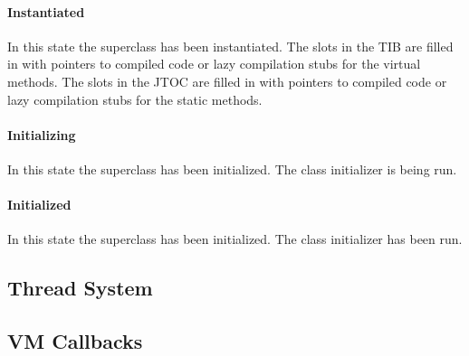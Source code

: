 \paragraph{Instantiated}
In this state the superclass has been instantiated.  The
slots in the TIB are filled in with pointers to compiled code or lazy
compilation stubs for
the virtual methods.  The slots in the JTOC are filled in with
pointers to compiled code or lazy compilation stubs for the static methods.

\paragraph{Initializing} 
In this state the superclass has been initialized. The class
initializer is being run. 

\paragraph{Initialized} 
In this state the superclass has been initialized. The class initializer has 
been run. 

\subsection{Thread System}\label{sec:threads}



\subsection{VM Callbacks}\label{sssec:callbacks}




